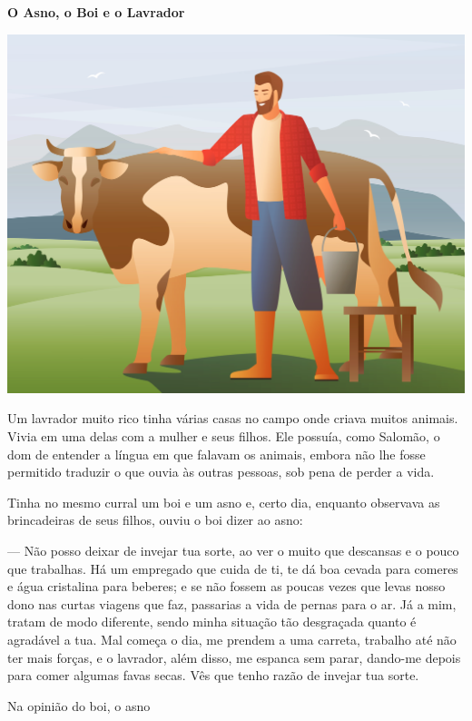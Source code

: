\begin{myquote}
\textbf{O Asno, o Boi e o Lavrador}

\begin{center}
\includegraphics[width=.8\textwidth]{media/image50.jpeg}
\end{center}

Um lavrador muito rico tinha várias casas no campo onde criava muitos
animais. Vivia em uma delas com a mulher e seus filhos. Ele possuía,
como Salomão, o dom de entender a língua em que falavam os animais,
embora não lhe fosse permitido traduzir o que ouvia às outras pessoas,
sob pena de perder a vida.

Tinha no mesmo curral um boi e um asno e, certo dia, enquanto observava
as brincadeiras de seus filhos, ouviu o boi dizer ao asno:

--- Não posso deixar de invejar tua sorte, ao ver o muito que descansas e
o pouco que trabalhas. Há um empregado que cuida de ti, te dá boa cevada
para comeres e água cristalina para beberes; e se não fossem as poucas
vezes que levas nosso dono nas curtas viagens que faz, passarias a vida
de pernas para o ar. Já a mim, tratam de modo diferente, sendo minha
situação tão desgraçada quanto é agradável a tua. Mal começa o dia, me
prendem a uma carreta, trabalho até não ter mais forças, e o lavrador,
além disso, me espanca sem parar, dando-me depois para comer algumas
favas secas. Vês que tenho razão de invejar tua sorte.

\end{myquote}

\pagebreak
Na opinião do boi, o asno


